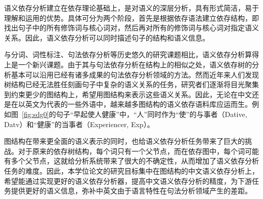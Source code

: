 语义依存分析建立在依存理论基础上，是对语义的深层分析，具有形式简洁，易于理解和运用的优势。具体可分为两个阶段，首先是根据依存语法建立依存结构，即找出句子中的所有修饰词与核心词对，然后再对所有的修饰词与核心词对指定语义关系。因此，语义依存分析可以同时描述句子的结构和语义信息。

与分词、词性标注、句法依存分析等历史悠久的研究课题相比，语义依存分析算得上是一个新兴课题。由于其与句法依存分析在结构上的相似之处，语义依存树的分析基本可以沿用已经有诸多成果的句法依存分析领域的方法。然而近年来人们发现树结构已经无法胜任刻画句子中复杂的语义关系的任务，研究者们逐渐将目光聚集到约束更少的图结构上，希望用图结构来表示这些语义关系。因此，无论在中文还是在以英文为代表的一些外语中，越来越多图结构的语义依存语料库应运而生。例如图~\ref{fig:sdg0}的句子“早起使人健康”中，“人”同时作为“使”的与事者（Dative, Datv）和“健康”的当事者（Experiencer, Exp）。

图结构在带来更全面的语义表示的同时，也给语义依存分析任务带来了巨大的挑战。对于原来的依存树结构，每个词只有一个父节点，而在依存图中，每个词可能有多个父节点，这就给分析系统带来了很大的不确定性，从而增加了语义依存分析任务的难度。因此，本学位论文的研究目标集中在图结构的中文语义依存分析上，希望能通过实现更好的语义依存分析器，提高中文语义依存分析的精度，为下游任务提供更好的语义信息，弥补中英文由于语言特性在句法分析领域产生的差距。